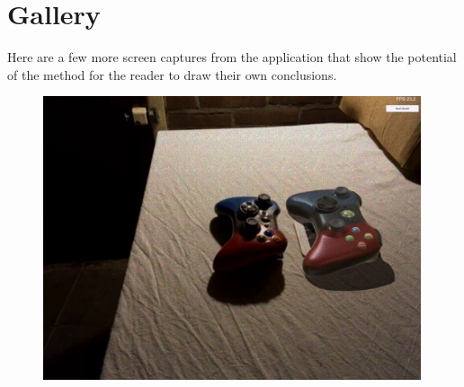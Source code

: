 \section{Gallery}

Here are a few more screen captures from the application that show the potential of the method for the reader to draw their own conclusions.

\begin{figure}[H]
    \centering
    \begin{minipage}{0.475\textwidth}
        \centering
        \includegraphics[width=0.99\textwidth]{Figures/ContBoth.png} %
 

\end{minipage}
\end{figure}
